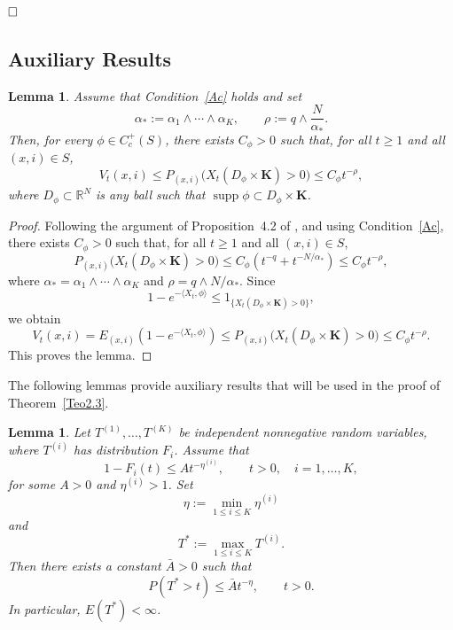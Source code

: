 \documentclass[reqno,final,11pt]{amsart}
\newcommand{\1}{\mathbbm{1}}
\renewcommand{\cite}{\citet}
\theoremstyle{plain}
\newtheorem{lemma}[theorem]{Lemma}
\theoremstyle{definition}
\theoremstyle{remark}
\begin{document}
\(\hfill\square\)


\subsection*{Auxiliary Results}






\begin{lemma}\label{lem:finite-mean-local-bound}
Assume that Condition~\ref{Ac} holds and set
\[
\alpha_*:=\alpha_1\wedge\cdots\wedge\alpha_K,
\qquad
\rho:=q\wedge\frac{N}{\alpha_*}.
\]
Then, for every \(\phi\in C_c^+(S)\), there exists \(C_\phi>0\) such that, for all \(t\ge
1\) and all \((x,i)\in S\),
\[
V_t(x,i)
\le
P_{(x,i)}\bigl(X_t(D_\phi\times\mathbf K)>0\bigr)
\le
C_\phi t^{-\rho},
\]
where \(D_\phi\subset\mathbb R^N\) is any ball such that
\(\operatorname{supp}\phi\subset D_\phi\times\mathbf K\).
\end{lemma}

\begin{proof}
Following the argument of Proposition~4.2 of \cite{GRW}, and using
Condition~\ref{Ac}, there exists \(C_\phi>0\) such that, for all \(t\ge1\) and all
\((x,i)\in S\),
\[
P_{(x,i)}\bigl(X_t(D_\phi\times\mathbf K)>0\bigr)
\le
C_\phi\left(t^{-q}+t^{-N/\alpha_*}\right)
\le
C_\phi t^{-\rho},
\]
where \(\alpha_*=\alpha_1\wedge\cdots\wedge\alpha_K\) and
\(\rho=q\wedge N/\alpha_*\). Since
\[
1-e^{-\langle X_t,\phi\rangle}
\le
1_{\{X_t(D_\phi\times\mathbf K)>0\}},
\]
we obtain
\[
V_t(x,i)
=
E_{(x,i)}\left(1-e^{-\langle X_t,\phi\rangle}\right)
\le
P_{(x,i)}\bigl(X_t(D_\phi\times\mathbf K)>0\bigr)
\le
C_\phi t^{-\rho}.
\]
This proves the lemma.
\end{proof}





The following lemmas provide auxiliary results that will be used in the proof of Theorem~\ref{Teo2.3}.

\begin{lemma}\label{lemaaux1}
Let \(T^{(1)},\dots,T^{(K)}\) be independent nonnegative random variables, where
\(T^{(i)}\) has distribution \(F_i\). Assume that
\[
1-F_i(t)\le A t^{-\eta^{(i)}},
\qquad t>0,\quad i=1,\dots,K,
\]
for some \(A>0\) and \(\eta^{(i)}>1\). Set
\[
\eta:=\min_{1\le i\le K}\eta^{(i)}
\]
and
\[
T^*:=\max_{1\le i\le K}T^{(i)}.
\]
Then there exists a constant \(\bar A>0\) such that
\begin{equation}\label{eq:max-tail-K}
P(T^*>t)\le \bar A t^{-\eta},
\qquad t>0.
\end{equation}
In particular, \(E(T^*)<\infty\).
\end{lemma}
\end{document}
